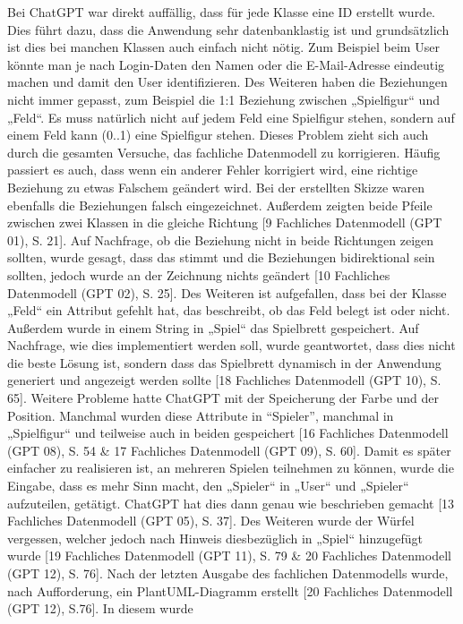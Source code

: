 Bei ChatGPT war direkt auffällig, dass für jede Klasse eine ID erstellt wurde. Dies führt dazu, dass die Anwendung sehr 
datenbanklastig ist und grundsätzlich ist dies bei manchen Klassen auch einfach nicht nötig. Zum Beispiel beim User könnte man 
je nach Login-Daten den Namen oder die E-Mail-Adresse eindeutig machen und damit den User identifizieren. Des Weiteren haben 
die Beziehungen nicht immer gepasst, zum Beispiel die 1:1 Beziehung zwischen „Spielfigur“ und „Feld“. Es muss natürlich nicht 
auf jedem Feld eine Spielfigur stehen, sondern auf einem Feld kann (0..1) eine Spielfigur stehen. Dieses Problem zieht sich auch 
durch die gesamten Versuche, das fachliche Datenmodell zu korrigieren. Häufig passiert es auch, dass wenn ein anderer Fehler korrigiert 
wird, eine richtige Beziehung zu etwas Falschem geändert wird. Bei der erstellten Skizze waren ebenfalls die Beziehungen falsch 
eingezeichnet. Außerdem zeigten beide Pfeile zwischen zwei Klassen in die gleiche Richtung [9 Fachliches Datenmodell (GPT 01), S. 21]. 
Auf Nachfrage, ob die Beziehung nicht in beide Richtungen zeigen sollten, wurde gesagt, dass das stimmt und die Beziehungen bidirektional 
sein sollten, jedoch wurde an der Zeichnung nichts geändert [10 Fachliches Datenmodell (GPT 02), S. 25]. Des Weiteren ist aufgefallen, 
dass bei der Klasse „Feld“ ein Attribut gefehlt hat, das beschreibt, ob das Feld belegt ist oder nicht. Außerdem wurde in einem 
String in „Spiel“ das Spielbrett gespeichert. Auf Nachfrage, wie dies implementiert werden soll, wurde geantwortet, dass dies nicht 
die beste Lösung ist, sondern dass das Spielbrett dynamisch in der Anwendung generiert und angezeigt werden sollte 
[18 Fachliches Datenmodell (GPT 10), S. 65]. Weitere Probleme hatte ChatGPT mit der Speicherung der Farbe und der Position. 
Manchmal wurden diese Attribute in ``Spieler'', manchmal in „Spielfigur“ und teilweise auch in beiden gespeichert 
[16 Fachliches Datenmodell (GPT 08), S. 54 \& 17 Fachliches Datenmodell (GPT 09), S. 60]. Damit es später einfacher zu realisieren 
ist, an mehreren Spielen teilnehmen zu können, wurde die Eingabe, dass es mehr Sinn macht, den „Spieler“ in „User“ und „Spieler“ 
aufzuteilen, getätigt. ChatGPT hat dies dann genau wie beschrieben gemacht [13 Fachliches Datenmodell (GPT 05), S. 37]. Des Weiteren 
wurde der Würfel vergessen, welcher jedoch nach Hinweis diesbezüglich in „Spiel“ hinzugefügt wurde 
[19 Fachliches Datenmodell (GPT 11), S. 79 \& 20 Fachliches Datenmodell (GPT 12), S. 76]. Nach der letzten Ausgabe des fachlichen 
Datenmodells wurde, nach Aufforderung, ein PlantUML-Diagramm erstellt [20 Fachliches Datenmodell (GPT 12), S.76]. In diesem wurde 

